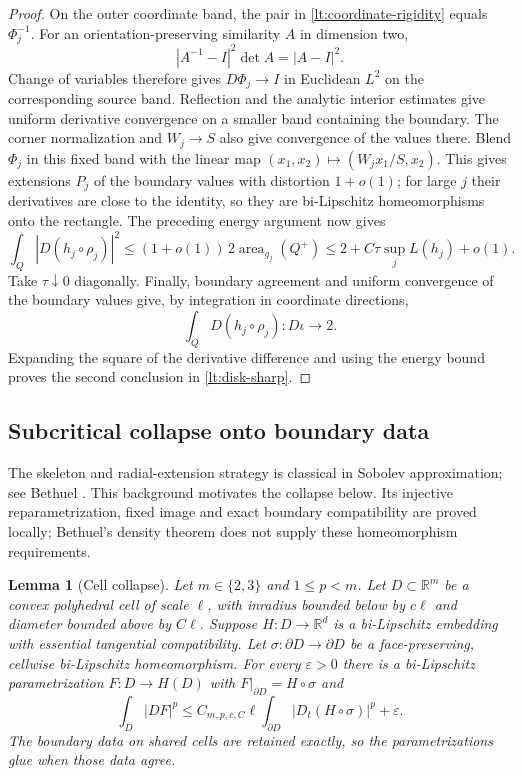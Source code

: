 \documentclass[11pt]{article}
\numberwithin{equation}{section}
\newtheorem{lemma}[theorem]{Lemma}
\theoremstyle{definition}
\theoremstyle{remark}
\newcommand{\R}{\mathbb R}
\newcommand{\eps}{\varepsilon}
\begin{document}
\begin{proof}
On the outer coordinate band, the pair in
\eqref{lt:coordinate-rigidity} equals $\Phi_j^{-1}$.  For an
orientation-preserving similarity $A$ in dimension two,
\[
 |A^{-1}-I|^2\det A=|A-I|^2.
\]
Change of variables therefore gives $D\Phi_j\to I$ in Euclidean
$L^2$ on the corresponding source band.  Reflection and the analytic
interior estimates give uniform derivative convergence on a smaller
band containing the boundary.  The corner normalization and $W_j\to S$
also give convergence of the values there.  Blend $\Phi_j$ in this
fixed band with the linear map
$(x_1,x_2)\mapsto(W_jx_1/S,x_2)$.  This gives extensions $P_j$ of the
boundary values with distortion $1+o(1)$; for large $j$ their derivatives
are close to the identity, so they are bi-Lipschitz homeomorphisms onto
the rectangle.  The preceding energy argument now gives
\[
 \int_Q|D(h_j\circ\rho_j)|^2
   \leq(1+o(1))\,2\operatorname{area}_{g_j}(Q^+)
   \leq2+C\tau\sup_jL(h_j)+o(1).
\]
Take $\tau\downarrow0$ diagonally.  Finally, boundary agreement and
uniform convergence of the boundary values give, by integration in
coordinate directions,
\[
 \int_Q D(h_j\circ\rho_j):D\iota\longrightarrow2.
\]
Expanding the square of the derivative difference and using the energy
bound proves the second conclusion in \eqref{lt:disk-sharp}.
\end{proof}

\subsection{Subcritical collapse onto boundary data}

The skeleton and radial-extension strategy is classical in Sobolev
approximation; see Bethuel \cite[Section~II.1, pp.~164--165, and
Section~II.3, Eqs.~(32), (37), pp.~170--171]{Bethuel1991}.
This background motivates the collapse below.  Its injective
reparametrization, fixed image and exact boundary compatibility are
proved locally; Bethuel's density theorem does not supply these
homeomorphism requirements.

\begin{lemma}[Cell collapse]
\label{lt:collapse}
Let $m\in\{2,3\}$ and $1\leq p<m$.  Let $D\subset\R^m$ be a
convex polyhedral cell of scale $\ell$, with inradius bounded below by
$c\ell$ and diameter bounded above by $C\ell$.  Suppose
$H:D\to\R^d$ is a bi-Lipschitz embedding with essential tangential
compatibility.  Let $\sigma:\partial D\to\partial D$ be a
face-preserving, cellwise bi-Lipschitz homeomorphism.  For every
$\eps>0$ there is a bi-Lipschitz parametrization $F:D\to H(D)$ with
$F|_{\partial D}=H\circ\sigma$ and
\begin{equation}
 \int_D|DF|^p
       \leq C_{m,p,c,C}\ell
                    \int_{\partial D}|D_t(H\circ\sigma)|^p+\eps.
 \label{lt:collapse-estimate}
\end{equation}
The boundary data on shared cells are retained exactly, so the
parametrizations glue when those data agree.
\end{lemma}
\end{document}
